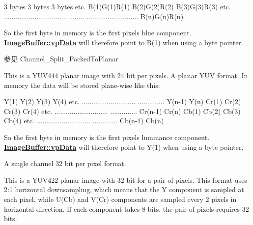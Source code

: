 \begin{Desc}
\begin{description}
\begin{DoxyCode}
3 bytes        3 bytes        3 bytes      etc.
B(1)G(1)R(1)   B(2)G(2)R(2)   B(3)G(3)R(3) etc.
..........................................
...........................   B(n)G(n)R(n)
\end{DoxyCode}


So the first byte in memory is the first pixels blue component. {\bfseries \hyperlink{struct_image_buffer_ab67c9c21d749e786302c848b508e0673}{Image\+Buffer\+::vp\+Data}} will therefore point to B(1) when using a byte pointer.

\begin{DoxySeeAlso}{参见}
Channel\+\_\+\+Split\+\_\+\+Packed\+To\+Planar 
\end{DoxySeeAlso}
\item[{\em 
\hypertarget{group___common_interface_gga456e8aa76e06bb761f27c52141475985a17d8f8351e7fa052310e23ba80e8f628}{ibpf\+Y\+U\+V444\+Planar}\label{group___common_interface_gga456e8aa76e06bb761f27c52141475985a17d8f8351e7fa052310e23ba80e8f628}
}]This is a Y\+U\+V444 planar image with 24 bit per pixels. A planar Y\+U\+V format. In memory the data will be stored plane-\/wise like this\+:


\begin{DoxyCode}
Y(1)    Y(2)    Y(3)    Y(4) etc.
............................
..............  Y(n-1)  Y(n)
Cr(1)   Cr(2)   Cr(3)   Cr(4) etc.
............................
..............  Cr(n-1) Cr(n)
Cb(1)   Cb(2)   Cb(3)   Cb(4) etc.
............................
.............   Cb(n-1) Cb(n)
\end{DoxyCode}


So the first byte in memory is the first pixels luminance component. {\bfseries \hyperlink{struct_image_buffer_ab67c9c21d749e786302c848b508e0673}{Image\+Buffer\+::vp\+Data}} will therefore point to Y(1) when using a byte pointer. \item[{\em 
\hypertarget{group___common_interface_gga456e8aa76e06bb761f27c52141475985a1985b2b25abddb93ed7bcc250b513a20}{ibpf\+Mono32}\label{group___common_interface_gga456e8aa76e06bb761f27c52141475985a1985b2b25abddb93ed7bcc250b513a20}
}]A single channel 32 bit per pixel format. \item[{\em 
\hypertarget{group___common_interface_gga456e8aa76e06bb761f27c52141475985a8f453c69ac940a1730fb9dd02bc81416}{ibpf\+Y\+U\+V422\+Planar}\label{group___common_interface_gga456e8aa76e06bb761f27c52141475985a8f453c69ac940a1730fb9dd02bc81416}
}]This is a Y\+U\+V422 planar image with 32 bit for a pair of pixels. This format uses 2\+:1 horizontal downsampling, which means that the Y component is sampled at each pixel, while U(\+Cb) and V(\+Cr) components are sampled every 2 pixels in horizontal direction. If each component takes 8 bits, the pair of pixels requires 32 bits.


\end{description}
\end{Desc}
